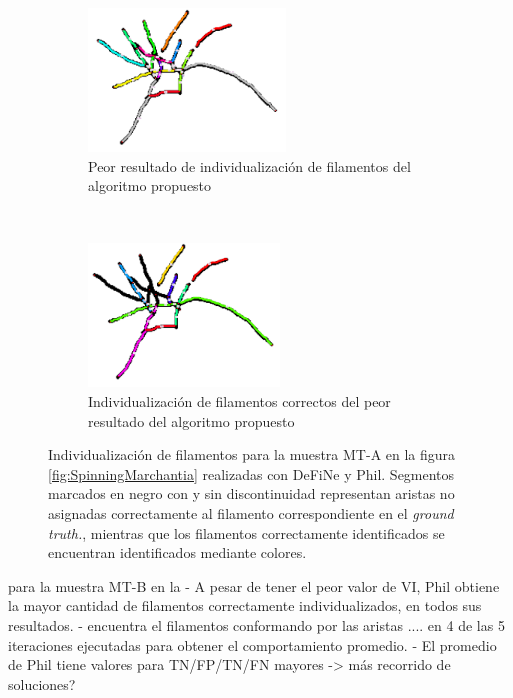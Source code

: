 \begin{figure}[h!]
    \begin{subfigure}[t]{0.49\textwidth}
        \centering
        \includegraphics[height=1.5in]{resultImages/50-ROIs-Spinning-Marchantia-phil-s10-v05-antLabeled.png}
        \caption{Peor resultado de individualizaci\'on de filamentos del algoritmo propuesto}
        \label{SpinningMarchantiaResults-worstPhil}
    \end{subfigure}
    ~ 
    \begin{subfigure}[t]{0.49\textwidth}
        \centering
        \includegraphics[height=1.5in]{resultImages/50-ROIs-Spinning-Marchantia-phil-s10-v05-exactMatch-antLabeled.png}
        \caption{Individualizaci\'on de filamentos correctos del peor resultado del algoritmo propuesto}
        \label{fig:SpinningMarchantiaResults-worstPhilExact}
    \end{subfigure}
    
    \caption{Individualizaci\'on  de filamentos para la muestra MT-A en la figura \ref{fig:SpinningMarchantia} realizadas con DeFiNe y Phil. Segmentos marcados en negro con y sin discontinuidad representan aristas no asignadas correctamente al filamento correspondiente en el {\it ground truth.}, mientras que los filamentos correctamente identificados se encuentran identificados mediante colores.}
    \label{fig:SpinningMarchantiaResults}
\end{figure}

\clearpage
\newpage



para la muestra MT-B en la
- A pesar de tener el peor valor de VI, Phil obtiene la mayor cantidad de filamentos correctamente individualizados, en todos sus resultados. 
- encuentra el filamentos conformando por las aristas .... en 4 de las 5 iteraciones ejecutadas para obtener el comportamiento promedio. 
- El promedio de Phil tiene valores para TN/FP/TN/FN  mayores -> m\'as recorrido de soluciones?


